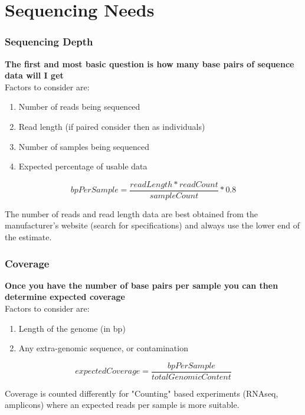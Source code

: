 \documentclass{beamer}
\begin{document}
\section{Sequencing Needs}
\begin{frame}
\frametitle{Sequencing Depth}
\textbf{ The first and most basic question is how many base pairs of sequence data will I get}\\
Factors to consider are:
\begin{enumerate}
\item Number of reads being sequenced
\item Read length (if paired consider then as individuals)
\item Number of samples being sequenced
\item Expected percentage of usable data
\end{enumerate}

\begin{equation*}
bpPerSample = \frac{readLength*readCount}{sampleCount} * 0.8
\end{equation*}

\begin{alert}
The number of reads and read length data are best obtained from the manufacturer's website (search for specifications)  and always use the lower end of the estimate.
\end{alert}
\end{frame}


\begin{frame}
\frametitle{Coverage}
\textbf{Once you have the number of base pairs per sample you can then determine expected coverage}\\
Factors to consider are:
\begin{enumerate}
\item Length of the genome (in bp)
\item Any extra-genomic sequence, or contamination
\end{enumerate}

\begin{equation*}
expectedCoverage = \frac{bpPerSample}{totalGenomicContent}
\end{equation*}

\begin{alert}
Coverage is counted differently for "Counting" based experiments (RNAseq, amplicons) where an expected reads per sample is more suitable.
\end{alert}
\end{frame}
\end{document}
